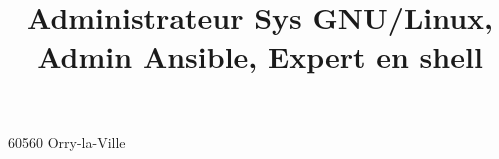 \title{Administrateur Sys GNU/Linux,\\ Admin Ansible, Expert en shell}

\usepackage{fontawesome5}
\providecommand*{\gitlabsocialsymbol}{}
\renewcommand*{\gitlabsocialsymbol}{{\scriptsize\faGitlab}~}

\address{4 Impasse de la ferme}{60560 Orry-la-Ville}

